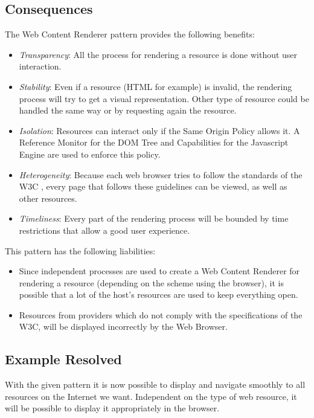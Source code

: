 \documentclass[prodmode,acmtecs]{acmsmall}
\begin{document}
  \subsection*{Consequences}
  The Web Content Renderer pattern provides the following benefits:
  \begin{itemize}
    \item \textit{Transparency}: All the process for rendering a resource is done without user interaction.
    \item \textit{Stability}: Even if a resource (HTML for example) is invalid, the rendering process will try to get a visual representation. Other type of resource could be handled the same way or by requesting again the resource.
    \item \textit{Isolation}: Resources can interact only if the Same Origin Policy allows it. A Reference Monitor for the DOM Tree and Capabilities for the Javascript Engine are used to enforce this policy.
    \item \textit{Heterogeneity}: Because each web browser tries to follow the standards of the W3C \cite{w3c}, every page that follows these guidelines can be viewed, as well as other resources.
    \item \textit{Timeliness}: Every part of the rendering process will be bounded by time restrictions that allow a good user experience.
  \end{itemize}
  This pattern has the following liabilities:
  \begin{itemize}
    \item Since independent processes are used to create a Web Content Renderer for rendering a resource (depending on the scheme using the browser), it is possible that a lot of the host's resources are used to keep everything open.
    \item Resources from providers which do not comply with the specifications of the W3C, will be displayed incorrectly by the Web Browser.
  \end{itemize}

  \subsection*{Example Resolved}
With the given pattern it is now possible to display and navigate smoothly to all resources on the Internet we want. Independent on the type of web resource, it will be possible to display it appropriately in the browser. 
\end{document}
